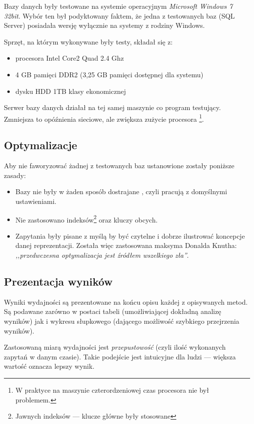 Bazy danych były testowane na systemie operacyjnym \emph{Microsoft Windows 7 32bit}.
Wybór ten był podyktowany faktem, że jedna z testowanych baz (SQL Server) posiadała wersję wyłącznie na systemy z rodziny Windows.

Sprzęt, na którym wykonywane były testy, składał się z:
\begin{itemize}
  \item procesora Intel Core2 Quad 2.4 Ghz
  \item 4 GB pamięci DDR2 (3,25 GB pamięci dostępnej dla systemu)
  \item dysku HDD 1TB klasy ekonomicznej
\end{itemize}

Serwer bazy danych działał na tej samej maszynie co program testujący.
Zmniejsza to opóźnienia sieciowe, ale zwiększa zużycie procesora%
\footnote{W praktyce na maszynie czterordzeniowej czas procesora nie był problemem.}.

\subsection*{Optymalizacje}

Aby nie faworyzować żadnej z testowanych baz ustanowione zostały poniższe zasady:
\begin{itemize}
    \item Bazy nie były w żaden sposób dostrajane , czyli pracują z domyślnymi ustawieniami.
    \item Nie zastosowano indeksów\footnote{Jawnych indeksów --- klucze główne były stosowane}
        oraz kluczy obcych.
    \item Zapytania były pisane z myślą by być czytelne i dobrze ilustrować koncepcje danej reprezentacji.
    Została więc zastosowana maksyma Donalda Knutha: \emph{,,przedwczesna optymalizacja jest źródłem wszelkiego zła''}.
\end{itemize}

\subsection*{Prezentacja wyników}

Wyniki wydajności są prezentowane na końcu opisu każdej z opisywanych metod.
Są podawane zarówno w postaci tabeli (umożliwiającej dokładną analizę wyników)
jak i wykresu słupkowego (dającego możliwość szybkiego przejrzenia wyników).

Zastosowaną miarą wydajności jest \emph{przepustowość} (czyli ilość wykonanych zapytań w danym czasie).
Takie podejście jest intuicyjne dla ludzi --- większa wartość oznacza lepszy wynik. 



